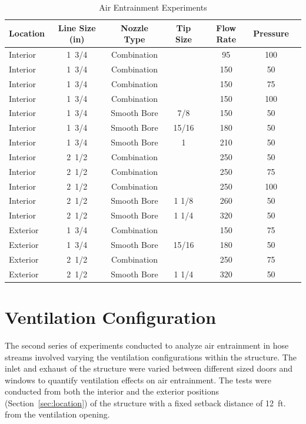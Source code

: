 \documentclass[12pt,oneside]{book}
\begin{document}
\begin{table}[!ht]
\centering
\caption{Air Entrainment Experiments}
\label{tab:Total_Air_Entrainment_Experiments}
\begin{tabular}{lcccccc}
\toprule[1.5pt]
Location & Line Size (in) & Nozzle Type & Tip Size & Flow Rate & Pressure \\ 
\midrule
Interior & 1~3/4 & Combination &       & 95 & 100 \\
Interior & 1~3/4 & Combination &       & 150 & 50 \\
Interior & 1~3/4 & Combination &       & 150 & 75 \\
Interior & 1~3/4 & Combination &       & 150 & 100 \\
\midrule
Interior & 1~3/4 & Smooth Bore & 7/8   & 150 & 50 \\
Interior & 1~3/4 & Smooth Bore & 15/16 & 180 & 50 \\
Interior & 1~3/4 & Smooth Bore & 1     & 210 & 50 \\
\midrule
Interior & 2~1/2 & Combination &       & 250 & 50 \\
Interior & 2~1/2 & Combination &       & 250 & 75 \\
Interior & 2~1/2 & Combination &       & 250 & 100 \\
\midrule
Interior & 2~1/2 & Smooth Bore & 1 1/8 & 260 & 50 \\
Interior & 2~1/2 & Smooth Bore & 1 1/4 & 320 & 50 \\
\midrule
Exterior & 1~3/4 & Combination &       & 150 & 75 \\
Exterior & 1~3/4 & Smooth Bore & 15/16 & 180 & 50 \\
\midrule
Exterior & 2~1/2 & Combination &       & 250 & 75 \\
Exterior & 2~1/2 & Smooth Bore & 1 1/4 & 320 & 50 \\
\bottomrule[1.25pt]
\end{tabular}
\end{table}

\clearpage

\section{Ventilation Configuration}

The second series of experiments conducted to analyze air entrainment in hose streams involved varying the ventilation configurations within the structure. The inlet and exhaust of the structure were varied between different sized doors and windows to quantify ventilation effects on air entrainment. The tests were conducted from both the interior and the exterior positions (Section~\ref{sec:location}) of the structure with a fixed setback distance of 12~ft. from the ventilation opening.
\end{document}
